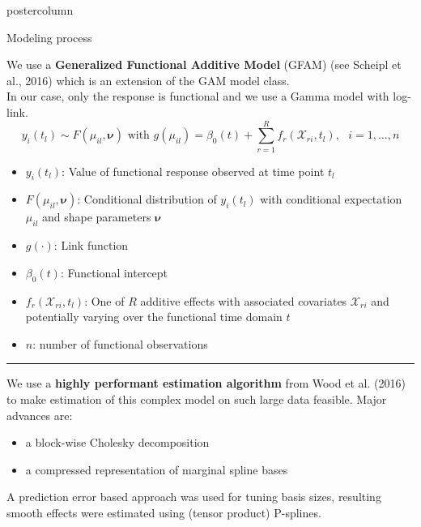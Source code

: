 \documentclass[final,hyperref={pdfpagelabels=false}]{beamer}
\newcommand{\bfGreen}[1]{\textcolor{koalablue}{\textbf{#1}}}
\newcommand*\circled[1]{\tikz[baseline=(char.base)]{
\node[shape=circle,draw,inner sep=2pt] (char) {#1};}}
\begin{document}
\begin{frame}
\begin{columns}
\begin{column}{1\textwidth}
\begin{columns}[T]
\begin{column}{.484\textwidth}
\begin{beamercolorbox}[center,wd=\textwidth]{postercolumn}
\begin{minipage}[T]{.95\textwidth}
\begin{block}{\footnotesize \circled{1} Modeling process}
\begin{minipage}[T]{.95\textwidth}  %
\vspace{1ex}
We use a \bfGreen{Generalized Functional Additive Model} (GFAM) (see Scheipl et al., 2016) which is an extension of the GAM model class.
\\
In our case, only the response is functional and we use a Gamma model with log-link.
\\
$$
y_i(t_l) \sim F(\mu_{il}, \boldsymbol{\nu}) \text{\ \ with\ \ } g(\mu_{il}) = \beta_0(t) + \sum\limits_{r=1}^R f_r(\boldsymbol{\mathcal{X}}_{ri}, t_l), \ \ \ i = 1,\ldots,n
$$
\begin{itemize}
  \item $y_i(t_l)$: Value of functional response observed at time point $t_l$
  \item $F(\mu_{il}, \boldsymbol{\nu})$: Conditional distribution of $y_i(t_l)$ with conditional expectation $\mu_{il}$ and shape parameters $\boldsymbol{\nu}$
  \item $g(\cdot)$: Link function
  \item $\beta_0(t)$: Functional intercept
  \item $f_r(\boldsymbol{\mathcal{X}}_{ri}, t_l)$: One of $R$ additive effects with associated covariates $\boldsymbol{\mathcal{X}}_{ri}$ and potentially varying over the functional time domain $t$
  \item $n$: number of functional observations
\end{itemize}
\vspace{2ex}

\noindent \textcolor[RGB]{220,220,220}{\rule{0.9\linewidth}{3pt}}
\vspace{2ex}

\noindent
We use a \bfGreen{highly performant estimation algorithm} from Wood et al. (2016) to make estimation of this complex model on such large data feasible. Major advances are:
\begin{itemize}
  \item a block-wise Cholesky decomposition
  \item a compressed representation of marginal spline bases
\end{itemize}
\vspace{1ex}
A prediction error based approach was used for tuning basis sizes, resulting smooth effects were estimated using (tensor product) P-splines.
\end{minipage}
\end{block}



\end{minipage}
\end{beamercolorbox}
\end{column}
\end{columns}
\end{column}
\end{columns}
\end{frame}
\end{document}
